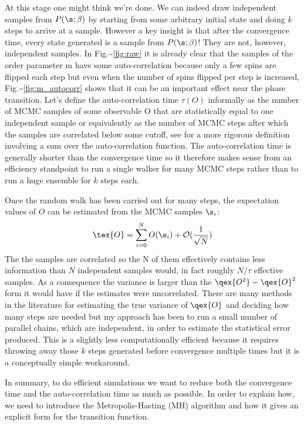 At this stage one might think we're done. We can indeed draw independent samples from \(P(\s; \beta)\) by starting from some arbitrary initial state and doing \(k\) steps to arrive at a sample. However a key insight is that after the convergence time, every state generated is a sample from \(P(\s; \beta)\)! They are not, however, independent samples. In Fig.\textasciitilde{}\ref{fig:raw} it is already clear that the samples of the order parameter m have some auto-correlation because only a few spins are flipped each step but even when the number of spins flipped per step is increased, Fig.\textasciitilde{}\ref{fig:m_autocorr} shows that it can be an important effect near the phase transition. Let's define the auto-correlation time \(\tau(O)\) informally as the number of MCMC samples of some observable O that are statistically equal to one independent sample or equivalently as the number of MCMC steps after which the samples are correlated below some cutoff, see \autocite{krauthIntroductionMonteCarlo1996} for a more rigorous definition involving a sum over the auto-correlation function. The auto-correlation time is generally shorter than the convergence time so it therefore makes sense from an efficiency standpoint to run a single walker for many MCMC steps rather than to run a huge ensemble for \(k\) steps each.

Once the random walk has been carried out for many steps, the expectation values of \(O\) can be estimated from the MCMC samples \(\s_i\): \[
    \tex{O} = \sum_{i = 0}^{N} O(\s_i) + \mathcal{O}(\frac{1}{\sqrt{N}})
\] The the samples are correlated so the N of them effectively contains less information than \(N\) independent samples would, in fact roughly \(N/\tau\) effective samples. As a consequence the variance is larger than the \(\qex{O^2} - \qex{O}^2\) form it would have if the estimates were uncorrelated. There are many methods in the literature for estimating the true variance of \(\qex{O}\) and deciding how many steps are needed but my approach has been to run a small number of parallel chains, which are independent, in order to estimate the statistical error produced. This is a slightly less computationally efficient because it requires throwing away those \(k\) steps generated before convergence multiple times but it is a conceptually simple workaround.

In summary, to do efficient simulations we want to reduce both the convergence time and the auto-correlation time as much as possible. In order to explain how, we need to introduce the Metropolis-Hasting (MH) algorithm and how it gives an explicit form for the transition function.

